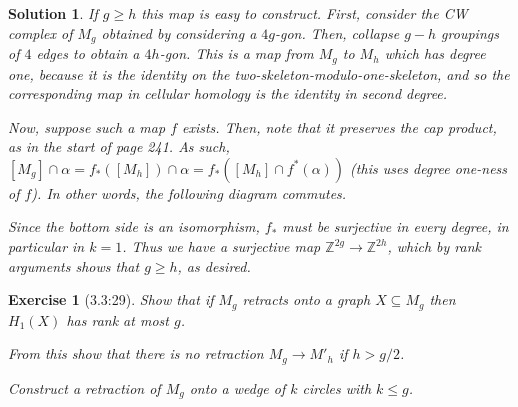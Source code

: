 \documentclass{article}
\theoremstyle{plain}
\newtheorem*{ex}{Exercise}
\theoremstyle{nonumberplain}
\newtheorem{sol}{Solution}
\newcommand{\Z}{\mathbb{Z}}
\begin{document}
\begin{sol}
If $g \geq h$ this map is easy to construct. First, consider the CW complex of $M_g$ obtained by considering a $4g$-gon. Then, collapse $g-h$ groupings of $4$ edges to obtain a $4h$-gon. This is a map from $M_g$ to $M_h$ which has degree one, because it is the identity on the two-skeleton-modulo-one-skeleton, and so the corresponding map in cellular homology is the identity in second degree.

Now, suppose such a map $f$ exists. Then, note that it preserves the cap product, as in the start of page 241. As such, $[M_g] \cap \alpha = f_*([M_h]) \cap \alpha = f_*([M_h] \cap f^*(\alpha))$ (this uses degree one-ness of $f$). In other words, the following diagram commutes.

Since the bottom side is an isomorphism, $f_*$ must be surjective in every degree, in particular in $k = 1$. Thus we have a surjective map $\Z^{2g} \to \Z^{2h}$, which by rank arguments shows that $g \geq h$, as desired.
\end{sol}

\begin{ex}[3.3:29]
Show that if $M_g$ retracts onto a graph $X \subseteq M_g$ then $H_1(X)$ has rank at most $g$.

From this show that there is no retraction $M_g \to M'_h$ if $h > g/2$.

Construct a retraction of $M_g$ onto a wedge of $k$ circles with $k \leq g$.
\end{ex}
\end{document}

